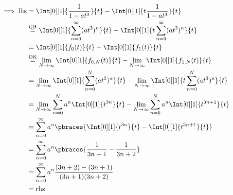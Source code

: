 \begin{solution}
\begin{enumerate}[label = \arabic*.]
    \begin{align*}
        \implies
        \mathrm{lhs}
        & =
        \Int[0][1]
        {
            \frac{1}{1 - a t^3}
        }{t}
        -
        \Int[0][1]
        {
            t
            \frac{1}{1 - a t^3}
        }{t} \\
        & \stackrel
        {
            \mathrm{GR}
        }{=}
        \Int[0][1]
        {
            \sum_{n=0}^\infty
            (a t^3)^n
        }{t}
        -
        \Int[0][1]
        {
            t
            \sum_{n=0}^\infty
            (a t^3)^n
        }{t} \\
        & =
        \Int[0][1]
        {
            f_0(t)
        }{t}
        -
        \Int[0][1]
        {
            f_1(t)
        }{t} \\
        & \stackrel
        {
            \mathrm{DK}
        }{=}
        \lim_{N \to \infty}
        \Int[0][1]
        {
            f_{0, N}(t)
        }{t}
        -
        \lim_{N \to \infty}
        \Int[0][1]
        {
            f_{1, N}(t)
        }{t} \\
        & =
        \lim_{N \to \infty}
        \Int[0][1]
        {
            \sum_{n=0}^N
            (a t^3)^n
        }{t}
        -
        \lim_{N \to \infty}
        \Int[0][1]
        {
            t
            \sum_{n=0}^N
            (a t^3)^n
        }{t} \\
        & =
        \lim_{N \to \infty}
        \sum_{n=0}^N
        a^n
        \Int[0][1]
        {
            t^{3 n}
        }{t}
        -
        \lim_{N \to \infty}
        \sum_{n=0}^N
        a^n
        \Int[0][1]
        {
            t^{3 n + 1}
        }{t} \\
        & =
        \sum_{n=0}^\infty
        a^n
        \pbraces
        {
            \Int[0][1]
            {
                t^{3 n}
            }{t}
            -
            \Int[0][1]
            {
                t^{3 n + 1}
            }{t}
        } \\
        & =
        \sum_{n=0}^\infty
        a^n
        \pbraces
        {
            \frac{1}{3 n + 1}
            -
            \frac{1}{3 n + 2}
        } \\
        & =
        \sum_{n=0}^\infty
        a^n
        \frac
        {
            (3 n + 2)
            -
            (3 n + 1)
        }{
            (3 n + 1)
            (3 n + 2)
        } \\
        & =
        \mathrm{rhs}
    \end{align*}


\end{enumerate}
\end{solution}
